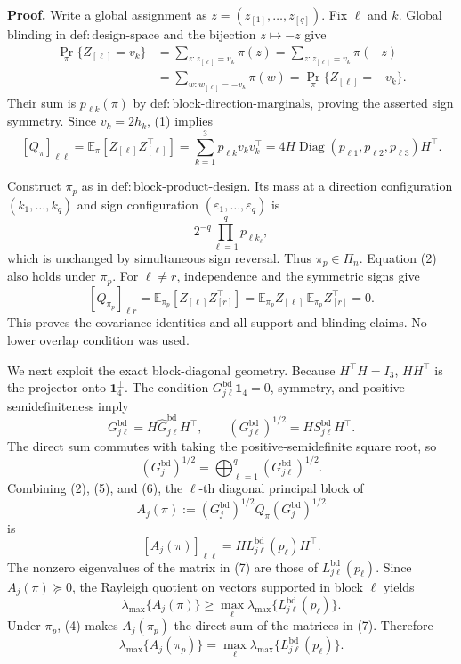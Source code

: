 \textbf{Proof.}
Write a global assignment as \(z=(z_{[1]},\ldots,z_{[q]})\). Fix \(\ell\) and \(k\). Global blinding in \(\mathrm{def:design\text{-}space}\) and the bijection \(z\mapsto-z\) give
\[
\begin{aligned}
\Pr_\pi\{Z_{[\ell]}=v_k\}
&=\sum_{z:z_{[\ell]}=v_k}\pi(z)
=\sum_{z:z_{[\ell]}=v_k}\pi(-z)\\
&=\sum_{w:w_{[\ell]}=-v_k}\pi(w)
=\Pr_\pi\{Z_{[\ell]}=-v_k\}.
\end{aligned}
\tag{1}
\]
Their sum is \(p_{\ell k}(\pi)\) by \(\mathrm{def:block\text{-}direction\text{-}marginals}\), proving the asserted sign symmetry. Since \(v_k=2h_k\), (1) implies
\[
[Q_\pi]_{\ell\ell}
=\mathbb E_\pi[Z_{[\ell]}Z_{[\ell]}^\top]
=\sum_{k=1}^3p_{\ell k}v_kv_k^\top
=4H\operatorname{Diag}(p_{\ell1},p_{\ell2},p_{\ell3})H^\top.
\tag{2}
\]

Construct \(\pi_p\) as in \(\mathrm{def:block\text{-}product\text{-}design}\). Its mass at a direction configuration \((k_1,\ldots,k_q)\) and sign configuration \((\varepsilon_1,\ldots,\varepsilon_q)\) is
\[
2^{-q}\prod_{\ell=1}^qp_{\ell k_\ell},
\tag{3}
\]
which is unchanged by simultaneous sign reversal. Thus \(\pi_p\in\Pi_n\). Equation (2) also holds under \(\pi_p\). For \(\ell\ne r\), independence and the symmetric signs give
\[
[Q_{\pi_p}]_{\ell r}
=\mathbb E_{\pi_p}[Z_{[\ell]}Z_{[r]}^\top]
=\mathbb E_{\pi_p}Z_{[\ell]}
\,\mathbb E_{\pi_p}Z_{[r]}^\top=0.
\tag{4}
\]
This proves the covariance identities and all support and blinding claims. No lower overlap condition was used.

We next exploit the exact block-diagonal geometry. Because \(H^\top H=I_3\), \(HH^\top\) is the projector onto \(\mathbf1_4^\perp\). The condition \(G^{\mathrm{bd}}_{j\ell}\mathbf1_4=0\), symmetry, and positive semidefiniteness imply
\[
G^{\mathrm{bd}}_{j\ell}
=H\widehat G^{\mathrm{bd}}_{j\ell}H^\top,
\qquad
(G^{\mathrm{bd}}_{j\ell})^{1/2}
=HS^{\mathrm{bd}}_{j\ell}H^\top.
\tag{5}
\]
The direct sum commutes with taking the positive-semidefinite square root, so
\[
(G_j^{\mathrm{bd}})^{1/2}
=\bigoplus_{\ell=1}^q(G^{\mathrm{bd}}_{j\ell})^{1/2}.
\tag{6}
\]
Combining (2), (5), and (6), the \(\ell\)-th diagonal principal block of
\[
A_j(\pi):=(G_j^{\mathrm{bd}})^{1/2}Q_\pi(G_j^{\mathrm{bd}})^{1/2}
\]
is
\[
[A_j(\pi)]_{\ell\ell}
=H L^{\mathrm{bd}}_{j\ell}(p_\ell)H^\top.
\tag{7}
\]
The nonzero eigenvalues of the matrix in (7) are those of \(L^{\mathrm{bd}}_{j\ell}(p_\ell)\). Since \(A_j(\pi)\succeq0\), the Rayleigh quotient on vectors supported in block \(\ell\) yields
\[
\lambda_{\max}\{A_j(\pi)\}
\ge\max_\ell\lambda_{\max}\{L^{\mathrm{bd}}_{j\ell}(p_\ell)\}.
\tag{8}
\]
Under \(\pi_p\), (4) makes \(A_j(\pi_p)\) the direct sum of the matrices in (7). Therefore
\[
\lambda_{\max}\{A_j(\pi_p)\}
=\max_\ell\lambda_{\max}\{L^{\mathrm{bd}}_{j\ell}(p_\ell)\}.
\tag{9}
\]

